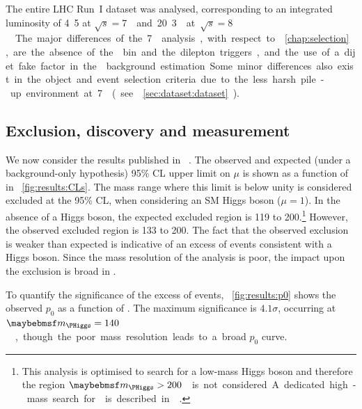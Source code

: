 
The entire LHC Run~I dataset was analysed, corresponding to an integrated luminosity of 
\unit{4.5}{\invfb} at \unit{$\sqrt{s} = 7$}{\TeV} and \unit{20.3}{\invfb} at 
\unit{$\sqrt{s} = 8$}{\TeV}. The major differences of the \unit{7}{\TeV} analysis, with 
respect to \Chapter~\ref{chap:selection}, are the absence of the \twojet bin and the 
dilepton triggers, and the use of a dijet fake factor in the \Wjets background estimation. 
Some minor differences also exist in the object and event selection criteria due to the less 
harsh pile-up environment at \unit{7}{\TeV} (see \Section~\ref{sec:dataset:dataset}).



\subsection{Exclusion, discovery and measurement}
\label{sec:results:limits}

We now consider the \HWW results published in \Reference~\cite{HWW-Moriond}.
The observed and expected (under a background-only hypothesis) 95\% CL upper limit on $\mu$ 
is shown as a function of \mH in \Figure~\ref{fig:results:CLs}. The mass range where this 
limit is below unity is considered excluded at the 95\% CL, when considering an SM Higgs 
boson ($\mu = 1$). In the absence of a Higgs boson, the expected excluded region is 
\unit{119}{\GeV} to \unit{200}{\GeV}.\footnote{
	This analysis is optimised to search for a low-mass Higgs boson and therefore the region 
	\unit{$\mH > 200$}{\GeV} is not considered. A dedicated high-mass search for \HWW is 
	described in \Reference~\cite{HWW-highmass}.
}
However, the observed excluded region is \unit{133}{\GeV} to \unit{200}{\GeV}.
The fact that the observed exclusion is weaker than expected is indicative of an excess of 
events consistent with a Higgs boson. Since the mass resolution of the \HWW analysis is 
poor, the impact upon the exclusion is broad in \mH.

To quantify the significance of the excess of events, \Figure~\ref{fig:results:p0} shows the 
observed $p_0$ as a function of \mH. The maximum significance is $4.1\sigma$, occurring at 
\unit{$\mH = 140$}{\GeV}, though the poor mass resolution leads to a broad $p_0$ curve. 

